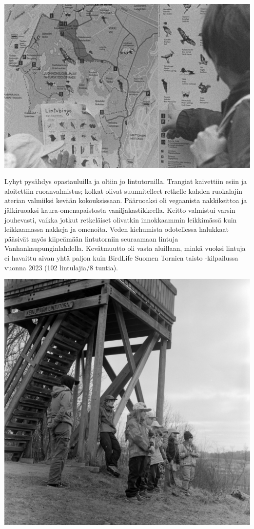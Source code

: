 \begin{multicols}{2}
	\begin{Figure}
		\noindent\includegraphics[width=\linewidth]{assets/kolkkienpäiväretkibw1}
	\end{Figure}

	Lyhyt pysähdys opastauluilla ja oltiin jo lintutornilla. Trangiat
	kaivettiin esiin ja aloitettiin ruoanvalmistus; kolkat olivat
	suunnitelleet retkelle kahden ruokalajin aterian valmiiksi kevään
	kokouksissaan. Pääruoaksi oli vegaanista nakkikeittoa ja jälkiruoaksi
	kaura-omenapaistosta vaniljakastikkeella. Keitto valmistui varsin
	jouhevasti, vaikka jotkut retkeläiset olivatkin innokkaammin
	leikkimässä kuin leikkaamassa nakkeja ja omenoita. Veden kiehumista
	odotellessa halukkaat pääsivät myös kiipeämään lintutorniin seuraamaan
	lintuja Vanhankaupunginlahdella. Kevätmuutto oli vasta aluillaan, minkä
	vuoksi lintuja ei havaittu aivan yhtä paljon kuin BirdLife Suomen
	Tornien taisto -kilpailussa vuonna 2023 (102 lintulajia/8 tuntia).

	\begin{center}
		\noindent\includegraphics[width=0.8\linewidth]{assets/kolkkienpäiväretkibw15}
	\end{center}


\end{multicols}
